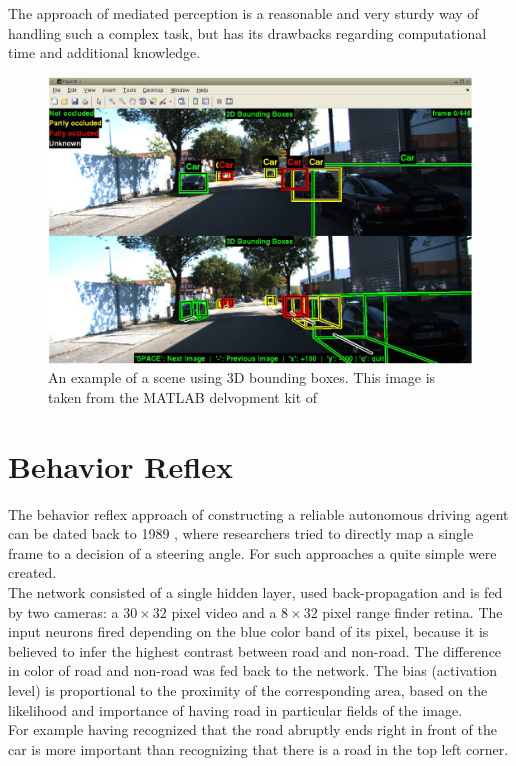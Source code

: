 The approach of mediated perception is a reasonable and very sturdy way of handling such a complex task, but has its drawbacks regarding computational time and additional knowledge.

\begin{figure}
	\centering
	\includegraphics[scale=0.4]{src/pic/3D-boundingbox-example.png}
	\caption{An example of a scene using 3D bounding boxes. This image is taken from the MATLAB delvopment kit of \cite{KITTI}}
	\label{pic: 3D Bounding Box}
\end{figure}

\section{Behavior Reflex}\label{sec: Behavior Reflex}

The behavior reflex approach of constructing a reliable autonomous driving agent can be dated back to 1989 , where researchers tried to directly map a single frame to a decision of a steering angle. For such approaches a quite simple \nn were created. \\
The network \alvinn consisted of a single hidden layer, used back-propagation and is fed by two cameras: a $30\times32$ pixel video and a $8\times32$ pixel range finder retina. The input neurons fired depending on the blue color band of its pixel, because it is believed to infer the highest contrast between road and non-road. The difference in color of road and non-road was fed back to the network. The bias (activation level) is proportional to the proximity of the corresponding area, based on the likelihood and importance of having road in particular fields of the image.\cite{pomerleau1989alvinn}\\
For example having recognized that the road abruptly ends right in front of the car is more important than recognizing that there is a road in the top left corner.\\

